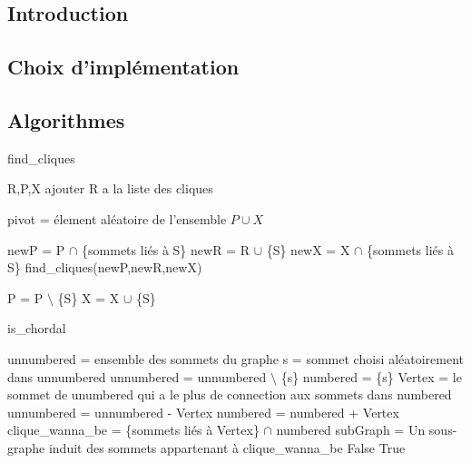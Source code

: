 \documentclass{article}
\begin{document}
	
	\subsection{Introduction}
	
	\subsection{Choix d'implémentation}
	
	\subsection{Algorithmes}
	
		\begin{algorithm}[H]
		\caption{find\_cliques}
		\begin{algorithmic}[1]
		\REQUIRE R,P,X
		\STATE ajouter R a la liste des cliques
		\ENDIF
		
		\ELSE
		
		\STATE pivot = élement aléatoire de l'ensemble $P \cup X $
		
		
		\STATE newP = P $\cap$ \{sommets liés à S\}
		\STATE newR = R $\cup$ \{S\}
		\STATE newX = X $\cap$ \{sommets liés à S\}
		\STATE find\_cliques(newP,newR,newX)
		
		\STATE P = P $\setminus$ \{S\}
		\STATE X = X $\cup$ \{S\}
		\ENDFOR		
		
		\ENDIF
	
	
		\end{algorithmic}
		\end{algorithm}

		\begin{algorithm}[H]
		\caption{is\_chordal}
		\begin{algorithmic}[1]		
		
		\STATE unnumbered = ensemble des sommets du graphe
		\STATE s = sommet choisi aléatoirement dans unnumbered
		\STATE unnumbered = unnumbered $\setminus$ \{s\}
		\STATE numbered  = \{s\}
			\STATE Vertex = le sommet de unumbered qui a le plus de connection aux sommets dans numbered
			\STATE unnumbered = unnumbered - Vertex
			\STATE numbered = numbered + Vertex
			\STATE clique\_wanna\_be = \{sommets liés à Vertex\} $\cap$ numbered
			\STATE subGraph	= Un sous-graphe induit des sommets appartenant à clique\_wanna\_be
				\RETURN False
			\ENDIF
		\ENDWHILE
		\RETURN True
		\end{algorithmic}
		\end{algorithm}
		
\end{document}
